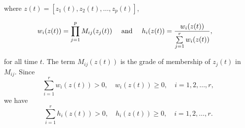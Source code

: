 where $z(t) = \left[z_1(t), z_2(t), \dots, z_p(t)\right]$, 

\begin{align}
  w_i(z(t)) &= \prod\limits_{j=1}^{p} M_{ij}(z_j(t)) &\ \mathrm{and}\ &&
  h_i(z(t)) &=  \frac{w_i(z(t))}{\sum\limits_{j=1}^{r} w_{i}(z(t))},
\end{align}

for all time $t$. The term $M_{ij}(z(t))$ is the grade of membership of $z_j(t)$ in $M_{ij}$. Since
\begin{equation}
\sum_{i=1}^{r} w_i(z(t)) > 0, \quad w_i(z(t)) \geq 0, \quad i = 1, 2, \dots, r,
\end{equation}
we have
\begin{equation}
\sum_{i=1}^{r} h_i(z(t)) > 0, \quad h_i(z(t)) \geq 0, \quad i = 1, 2, \dots, r.
\end{equation}